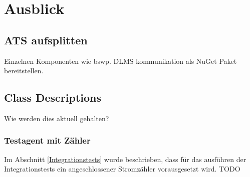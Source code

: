 
\chapter{Ausblick}

\section{ATS aufsplitten}\label{ausblick:ats_split}
Einzelnen Komponenten wie bswp. DLMS kommunikation als NuGet Paket bereitstellen.


\section{Class Descriptions}
Wie werden dies aktuell gehalten?


\subsection{Testagent mit Zähler}
Im Abschnitt \ref{Integrationstests} wurde beschrieben, dass für das ausführen der Integrationstests ein angeschlossener Stromzähler vorausgesetzt wird.
TODO